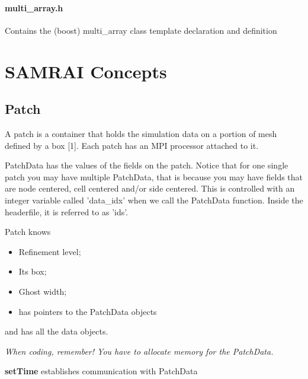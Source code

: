 \documentclass[12pt,a4paper,twoside]{article}
\begin{document}
\paragraph{multi\_array.h}
Contains the (boost) multi\_array class template declaration and definition


\section{SAMRAI Concepts}



\subsection*{Patch}


A patch is a container that holds the simulation data on a portion of mesh defined by a box [1].
Each patch has an MPI processor attached to it. 

PatchData has the values of the fields on the patch. Notice that for one single patch you may have multiple PatchData, that is because you may have fields that are node centered, cell centered and/or side centered. This is controlled with an integer variable called 'data\_idx' when we call the PatchData function. Inside the headerfile, it is referred to as 'ids'.

Patch knows
\begin{itemize}
    \item Refinement level;
    \item Its box;
    \item Ghost width;
    \item has pointers to the PatchData objects
\end{itemize}
and has all the data objects. 

\textit{When coding, remember! You have to allocate memory for the PatchData.} 


\textbf{setTime } establishes communication with PatchData




\end{document}
